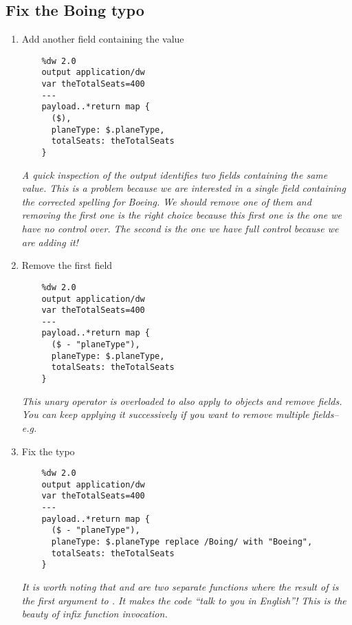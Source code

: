 \subsection{Fix the Boing typo}
\begin{enumerate}[resume*]
\item Add another field containing the  value
  \begin{verbatim}
    %dw 2.0
    output application/dw
    var theTotalSeats=400
    ---
    payload..*return map {
      ($),
      planeType: $.planeType,
      totalSeats: theTotalSeats
    }
  \end{verbatim}
  \emph {
    A quick inspection of the output identifies two  fields containing the same value.  This is a problem because we are interested in a single field containing the corrected spelling for Boeing.  We should remove one of them and removing the first one is the right choice because this first one is the one we have no control over.  The second  is the one we have full control because we are adding it!
  }
\item Remove the first  field
  \begin{verbatim}
    %dw 2.0
    output application/dw
    var theTotalSeats=400
    ---
    payload..*return map {
      ($ - "planeType"),
      planeType: $.planeType,
      totalSeats: theTotalSeats
    }
  \end{verbatim}
  \emph{
    This unary \ttt{-} operator is overloaded to also apply to objects and remove fields.  You can keep applying it successively if you want to remove multiple fields--e.g.  
  }
\item Fix the  typo
  \begin{verbatim}
    %dw 2.0
    output application/dw
    var theTotalSeats=400
    ---
    payload..*return map {
      ($ - "planeType"),
      planeType: $.planeType replace /Boing/ with "Boeing",
      totalSeats: theTotalSeats
    }
  \end{verbatim}
  \emph{
    It is worth noting that  and  are two separate functions where the result of  is the first argument to .  It makes the code ``talk to you in English''!  This is the beauty of infix function invocation. 
  }
\end{enumerate}

